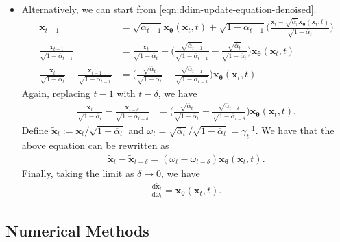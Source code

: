 \documentclass[10pt]{article}
\newcommand{\dee}{\mathrm{d}}
\newcommand{\ve}[1]{\mathbf{#1}}
\newcommand{\ves}[1]{\boldsymbol{#1}}
\newcommand{\ov}[1]{\overline{#1}}
\begin{document}
\begin{itemize}
  \item Alternatively, we can start from \eqref{eqn:ddim-update-equation-denoised}.
  \begin{align*}
    \ve{x}_{t-1} 
    &= \sqrt{\ov{\alpha}_{t-1}}\ve{x}_{\ves{\theta}}(\ve{x}_t, t) + \sqrt{1 - \ov{\alpha}_{t-1}} \bigg( \frac{\ve{x}_t - \sqrt{\ov{\alpha}_t}\ve{x}_{\ves{\theta}}(\ve{x}_t, t)}{\sqrt{1 - \ov{\alpha}_t}} \bigg) \\
    \frac{\ve{x}_{t-1}}{\sqrt{1 - \ov{\alpha}_{t-1}}} 
    &= \frac{\ve{x}_{t}}{\sqrt{1 - \ov{\alpha}_{t}}} + \bigg( \frac{\sqrt{\ov{\alpha}_{t-1}}}{\sqrt{1 - \ov{\alpha}_{t-1}}} - \frac{\sqrt{\ov{\alpha}_t}}{\sqrt{1 - \ov{\alpha}_t}} \bigg) \ve{x}_{\ves{\theta}}(\ve{x}_t, t) \\
    \frac{\ve{x}_{t}}{\sqrt{1 - \ov{\alpha}_{t}}} - \frac{\ve{x}_{t-1}}{\sqrt{1 - \ov{\alpha}_{t-1}}} 
    &= \bigg( \frac{\sqrt{\ov{\alpha}_{t}}}{\sqrt{1 - \ov{\alpha}_{t}}} - \frac{\sqrt{\ov{\alpha}_{t-1}}}{\sqrt{1 - \ov{\alpha}_{t-1}}} \bigg) \ve{x}_{\ves{\theta}}(\ve{x}_t, t).
  \end{align*}
  Again, replacing $t-1$ with $t-\delta$, we have 
  \begin{align*}
    \frac{\ve{x}_{t}}{\sqrt{1 - \ov{\alpha}_{t}}} - \frac{\ve{x}_{t-\delta}}{\sqrt{1 - \ov{\alpha}_{t-\delta}}} 
    &= \bigg( \frac{\sqrt{\ov{\alpha}_{t}}}{\sqrt{1 - \ov{\alpha}_{t}}} - \frac{\sqrt{\ov{\alpha}_{t-\delta}}}{\sqrt{1 - \ov{\alpha}_{t-\delta}}} \bigg) \ve{x}_{\ves{\theta}}(\ve{x}_t, t).
  \end{align*}
  Define $\widetilde{\ve{x}}_t := \ve{x}_t / \sqrt{1-\ov{\alpha}_t}$ and $\omega_t = \sqrt{\ov{\alpha}_t}/\sqrt{1 - \ov{\alpha}_t} = \gamma_t^{-1}$. We have that the above equation can be rewritten as
  \begin{align} \label{eqn:ddim-difference-equation-denoised}
    \widetilde{\ve{x}}_t - \widetilde{\ve{x}}_{t-\delta} = (\omega_t - \omega_{t-\delta}) \ve{x}_{\ves{\theta}}(\ve{x}_t, t).
  \end{align}
  Finally, taking the limit as $\delta \rightarrow 0$, we have
  \begin{align} \label{eqn:simpler-ddim-ode-denoised}
    \frac{\dee \widetilde{\ve{x}}_t}{\dee \omega_t} = \ve{x}_{\ves{\theta}}(\ve{x}_t, t).
  \end{align}  
\end{itemize}

\subsection{Numerical Methods} \label{sec:numerical-methods}
\end{document}
